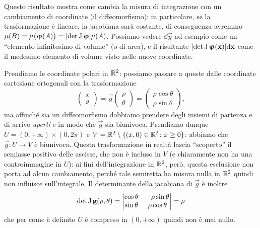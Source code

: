 Questo risultato mostra come cambia la misura di integrazione con un cambiamento di coordinate (il diffeomorfismo): in particolare, se la trasformazione è lineare, la jacobiana sarà costante, di conseguenza avremmo $\mu(B)=\mu\big(\bm{\upvarphi}(A)\big)=\lvert\det\operatorname{J}\bm{\upvarphi}\rvert\mu(A)$.
Possiamo vedere $\dd\vec y$ ad esempio come un ``elemento infinitesimo di volume'' (o di area), e il risultante $\lvert\det\operatorname{J}\bm{\upvarphi}(\mathbf{x})\rvert\textup{d}\mathbf{x}$ come il medesimo elemento di volume visto nelle nuove coordinate.

\begin{esempio} \label{es:jacobiano-coordinate-polari}
	Prendiamo le coordinate polari in $\mathbb{R}^2$: possiamo passare a queste dalle coordinate cartesiane ortogonali con la trasformazione
	\begin{equation}
		\begin{pmatrix}
			x\\y
		\end{pmatrix}
		=\vec g
		\begin{pmatrix}
			\rho\\\theta
		\end{pmatrix}
		=
		\begin{pmatrix}
			\rho\cos\theta\\\rho\sin\theta
		\end{pmatrix},
	\end{equation}
	ma affinch\'e sia un diffeomorfismo dobbiamo prendere degli insiemi di partenza e di arrivo \emph{aperti} e in modo che $\vec g$ sia biunivoca.
	Prendiamo dunque $U=(0,+\infty)\times(0,2\pi)$ e $V=\mathbb{R}^2\setminus\{(x,0)\in\mathbb{R}^2\colon x\geq 0\}$: abbiamo che $\vec g\colon U\to V$ è biunivoca.
	Questa trasformazione in realtà lascia ``scoperto'' il semiasse positivo delle ascisse, che non è incluso in $V$ (e chiaramente non ha una controimmagine in $U$): ai fini dell'integrazione in $\mathbb{R}^2$, però, questa esclusione non porta ad alcun cambiamento, perch\'e tale semiretta ha misura nulla in $\mathbb{R}^2$ quindi non influisce sull'integrale.
	Il determinante della jacobiana di $\vec g$ è inoltre
	\begin{equation}
		\det\operatorname{J}\mathbf{g}(\rho,\theta)=
		\begin{vmatrix}
			\cos\theta &-\rho\sin\theta\\
			\sin\theta &\rho\cos\theta
		\end{vmatrix}
		=\rho
	\end{equation}
	che per come è definito $U$ è compreso in $(0,+\infty)$ quindi non è mai nullo.
\end{esempio}
